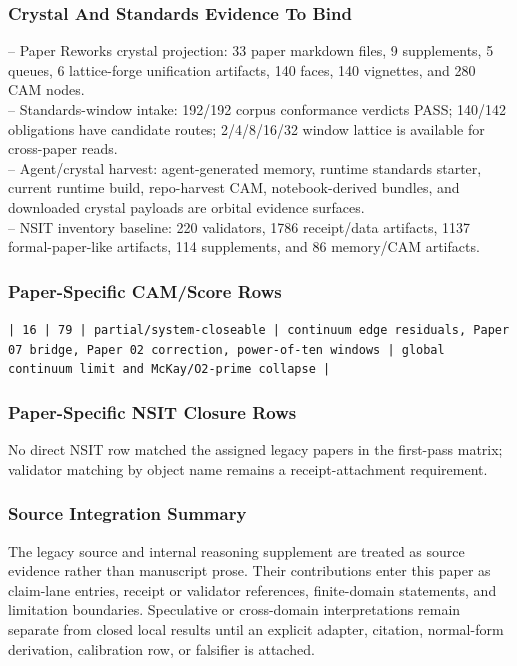 \documentclass[11pt]{article}
\begin{document}
\subsubsection*{Crystal And Standards Evidence To Bind}

\noindent{}-- Paper Reworks crystal projection: 33 paper markdown files, 9 supplements, 5 queues, 6 lattice-forge unification artifacts, 140 faces, 140 vignettes, and 280 CAM nodes.\\
\noindent{}-- Standards-window intake: 192/192 corpus conformance verdicts PASS; 140/142 obligations have candidate routes; 2/4/8/16/32 window lattice is available for cross-paper reads.\\
\noindent{}-- Agent/crystal harvest: agent-generated memory, runtime standards starter, current runtime build, repo-harvest CAM, notebook-derived bundles, and downloaded crystal payloads are orbital evidence surfaces.\\
\noindent{}-- NSIT inventory baseline: 220 validators, 1786 receipt/data artifacts, 1137 formal-paper-like artifacts, 114 supplements, and 86 memory/CAM artifacts.\\

\subsubsection*{Paper-Specific CAM/Score Rows}

\noindent\texttt{| 16 | 79 | partial/system-closeable | continuum edge residuals, Paper 07 bridge, Paper 02 correction, power-of-ten windows | global continuum limit and McKay/O2-prime collapse |}\\

\subsubsection*{Paper-Specific NSIT Closure Rows}

No direct NSIT row matched the assigned legacy papers in the first-pass matrix; validator matching by object name remains a receipt-attachment requirement.

\subsubsection*{Source Integration Summary}

The legacy source and internal reasoning supplement are treated as source
evidence rather than manuscript prose. Their contributions enter this paper as
claim-lane entries, receipt or validator references, finite-domain statements,
and limitation boundaries. Speculative or cross-domain interpretations remain
separate from closed local results until an explicit adapter, citation,
normal-form derivation, calibration row, or falsifier is attached.
\end{document}
